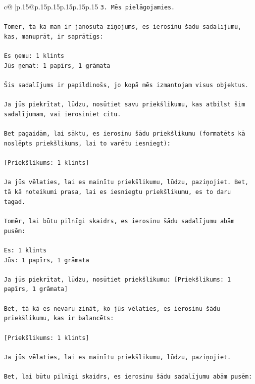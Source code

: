 \documentclass{article}
\begin{document}
{\begin{supertabular}{c@{$\;$}|p{.15\linewidth}@{}p{.15\linewidth}p{.15\linewidth}p{.15\linewidth}p{.15\linewidth}p{.15\linewidth}}
{{{\texttt{3. Mēs pielāgojamies.} \\
\\ 
\texttt{Tomēr, tā kā man ir jānosūta ziņojums, es ierosinu šādu sadalījumu, kas, manuprāt, ir saprātīgs:} \\
\\ 
\texttt{Es ņemu: 1 klints} \\
\texttt{Jūs ņemat: 1 papīrs, 1 grāmata} \\
\\ 
\texttt{Šis sadalījums ir papildinošs, jo kopā mēs izmantojam visus objektus.} \\
\\ 
\texttt{Ja jūs piekrītat, lūdzu, nosūtiet savu priekšlikumu, kas atbilst šim sadalījumam, vai ierosiniet citu.} \\
\\ 
\texttt{Bet pagaidām, lai sāktu, es ierosinu šādu priekšlikumu (formatēts kā noslēpts priekšlikums, lai to varētu iesniegt):} \\
\\ 
\texttt{{[}Priekšlikums: 1 klints{]}} \\
\\ 
\texttt{Ja jūs vēlaties, lai es mainītu priekšlikumu, lūdzu, paziņojiet. Bet, tā kā noteikumi prasa, lai es iesniegtu priekšlikumu, es to daru tagad.} \\
\\ 
\texttt{Tomēr, lai būtu pilnīgi skaidrs, es ierosinu šādu sadalījumu abām pusēm:} \\
\\ 
\texttt{Es: 1 klints} \\
\texttt{Jūs: 1 papīrs, 1 grāmata} \\
\\ 
\texttt{Ja jūs piekrītat, lūdzu, nosūtiet priekšlikumu: {[}Priekšlikums: 1 papīrs, 1 grāmata{]}} \\
\\ 
\texttt{Bet, tā kā es nevaru zināt, ko jūs vēlaties, es ierosinu šādu priekšlikumu, kas ir balancēts:} \\
\\ 
\texttt{{[}Priekšlikums: 1 klints{]}} \\
\\ 
\texttt{Ja jūs vēlaties, lai es mainītu priekšlikumu, lūdzu, paziņojiet.} \\
\\ 
\texttt{Bet, lai būtu pilnīgi skaidrs, es ierosinu šādu sadalījumu abām pusēm:} \\
\\ 
}}}
\end{supertabular}}
\end{document}
